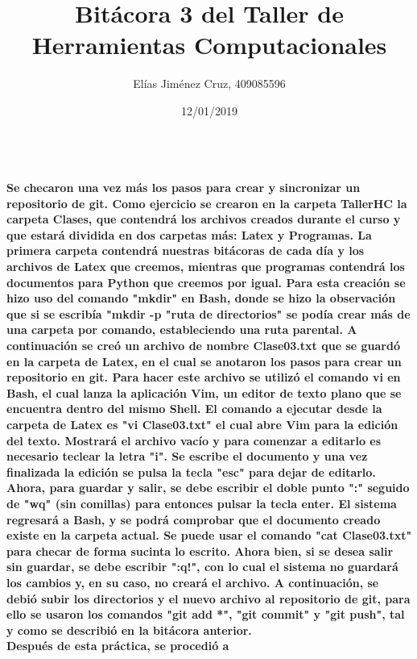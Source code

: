 \documentclass[letterpaper, 12pt, oneside]{article} %
\title{\Huge Bitácora 3 del Taller de Herramientas Computacionales}
\author{Elías Jiménez Cruz, 409085596}
\date{12/01/2019}
\begin{document}
	\maketitle
	\paragraph{\\Se checaron una vez más los pasos para crear y sincronizar un repositorio de git. Como ejercicio se crearon en la carpeta TallerHC la carpeta Clases, que contendrá los archivos creados durante el curso y que estará dividida en dos carpetas más: Latex y Programas. La primera carpeta contendrá nuestras bitácoras de cada día y los archivos de Latex que creemos, mientras que programas contendrá los documentos para Python que creemos por igual. Para esta creación se hizo uso del comando "mkdir" en Bash, donde se hizo la observación que si se escribía "mkdir -p "ruta de directorios" se podía crear más de una carpeta por comando, estableciendo una ruta parental. A continuación se creó un archivo de nombre Clase03.txt que se guardó en la carpeta de Latex, en el cual se anotaron los pasos para crear un repositorio en git. Para hacer este archivo se utilizó el comando vi en Bash, el cual lanza la aplicación Vim, un editor de texto plano que se encuentra dentro del mismo Shell. El comando a ejecutar desde la carpeta de Latex es "vi Clase03.txt" el cual abre Vim para la edición del texto. Mostrará el archivo vacío y para comenzar a editarlo es necesario teclear la letra "i". Se escribe el documento y una vez finalizada la edición se pulsa la tecla "esc" para dejar de editarlo. Ahora, para guardar y salir, se debe escribir el doble punto ":" seguido de "wq" (sin comillas) para entonces pulsar la tecla enter. El sistema regresará a Bash, y se podrá comprobar que el documento creado existe en la carpeta actual. Se puede usar el comando "cat Clase03.txt" para checar de forma sucinta lo escrito. Ahora bien, si se desea salir sin guardar, se debe escribir ":q!", con lo cual el sistema no guardará los cambios y, en su caso, no creará el archivo. A continuación, se debió subir los directorios y el nuevo archivo al repositorio de git, para ello se usaron los comandos "git add *", "git commit" y "git push", tal y como se describió en la bitácora anterior.\\Después de esta práctica, se procedió a }
\end{document}
